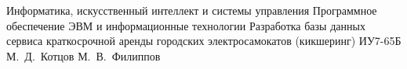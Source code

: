 \documentclass{bmstu}
\begin{document}
\makecourseworktitle
    {Информатика, искусственный интеллект и системы управления}
    {Программное обеспечение ЭВМ и информационные технологии}
    {Разработка базы данных сервиса краткосрочной аренды городских электросамокатов (кикшеринг)}
    {ИУ7-65Б}
    {М.~Д.~Котцов}
    {М.~В.~Филиппов}
    {}
    {}

\setcounter{page}{3}



\maketableofcontents





\makebibliography
\end{document}
